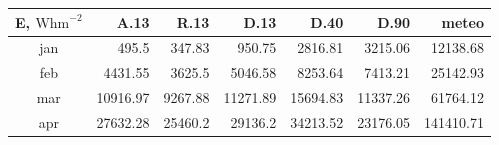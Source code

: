 \begin{tabular}{ | c | r r r r r r | }\hline
E, $\textrm{Whm}^{-2}$	&A.13	&R.13	&D.13	&D.40	&D.90	&meteo\\ \hline
jan		&495.5	&347.83	&950.75	&2816.81	&3215.06	&12138.68\\
feb		&4431.55	&3625.5	&5046.58	&8253.64	&7413.21	&25142.93\\
mar		&10916.97	&9267.88	&11271.89	&15694.83	&11337.26	&61764.12\\
apr		&27632.28	&25460.2	&29136.2	&34213.52	&23176.05	&141410.71\\ \hline
\end{tabular}